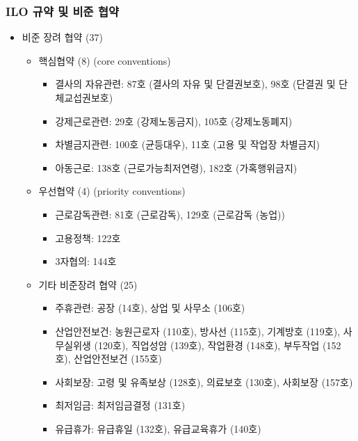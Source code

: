 \documentclass[aspectratio=169,xcolor=dvipsnames,handout]{beamer}
\begin{document}
\begin{frame}[allowframebreaks]
    \frametitle{ILO 규약 및 비준 협약}
    \begin{itemize}[<+->]
        \item 비준 장려 협약 (37)
        \begin{itemize}[<+->]
            \item 핵심협약 (8) (core conventions)
            \begin{itemize}
                \item 결사의 자유관련: 87호 (결사의 자유 및 단결권보호), 98호 (단결권 및 단체교섭권보호)
                \item 강제근로관련: 29호 (강제노동금지), 105호 (강제노동폐지)
                \item 차별금지관련: 100호 (균등대우), 11호 (고용 및 작업장 차별금지)
                \item 아동근로: 138호 (근로가능최저연령), 182호 (가혹행위금지)
            \end{itemize}
        \end{itemize}
        \begin{itemize}[<+->]
            \item 우선협약 (4) (priority conventions)
            \begin{itemize}
                \item 근로감독관련: 81호 (근로감독), 129호 (근로감독 (농업))
                \item 고용정책: 122호
                \item 3자협의: 144호
            \end{itemize}
        \end{itemize}
    \framebreak%
        \begin{itemize}[<+->]
            \item 기타 비준장려 협약 (25)
            \begin{itemize}
                \item 주휴관련: 공장 (14호), 상업 및 사무소 (106호)
                \item 산업안전보건: 농원근로자 (110호), 방사선 (115호), 기계방호 (119호), 사무실위생 (120호), 직업성암 (139호), 작업환경 (148호), 부두작업 (152호), 산업안전보건 (155호) 
                \item 사회보장: 고령 및 유족보상 (128호), 의료보호 (130호), 사회보장 (157호)
                \item 최저임금: 최저임금결정 (131호)
                \item 유급휴가: 유급휴일 (132호), 유급교육휴가 (140호)

\end{itemize}
\end{itemize}
\end{itemize}
\end{frame}
\end{document}
